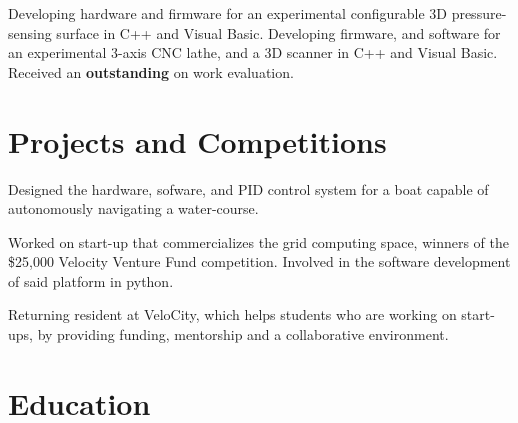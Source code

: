 \documentclass[11pt,a4paper]{moderncv}
\begin{document}
{Developing hardware and firmware for an experimental configurable 3D pressure-sensing surface in C++ and Visual Basic.
    \newline{}Developing firmware, and software for an experimental 3-axis CNC lathe, and a 3D scanner in C++ and Visual Basic.
\newline{}Received an \textbf{outstanding} on work evaluation.}

\section{Projects and Competitions}

{Designed the hardware, sofware, and PID control system for a boat capable of autonomously navigating a water-course.}

{Worked on start-up that commercializes the grid computing space, winners of the \$25,000 Velocity Venture Fund competition.
\newline{}Involved in the software development of said platform in python.}

{Returning resident at VeloCity, which helps students who are working on start-ups, by providing funding, mentorship and a collaborative environment.}

\section{Education}
\end{document}
